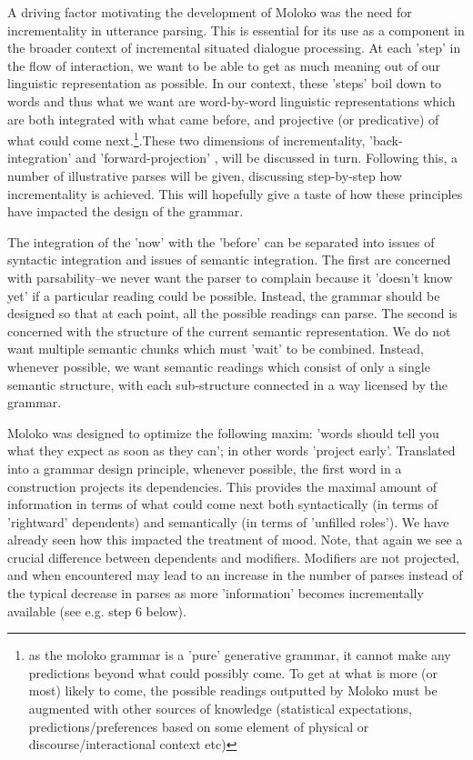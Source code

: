 
A driving factor motivating the development of Moloko was the need for incrementality in utterance parsing. This is essential for its use as a component in the broader context of incremental situated dialogue processing. At each 'step' in the flow of interaction, we want to be able to get as much meaning out of our linguistic representation as possible. In our context, these 'steps' boil down to words and thus what we want are word-by-word linguistic representations which are both integrated with what came before, and projective (or predicative) of what could come next.\footnote{as the moloko grammar is a 'pure' generative grammar, it cannot make any predictions beyond what could possibly come. To get at what is more (or most) likely to come, the possible readings outputted by Moloko must be augmented with other sources of knowledge (statistical expectations, predictions/preferences based on some element of physical or  discourse/interactional context  etc)}.These two dimensions of incrementality, 'back-integration' and 'forward-projection' , will be discussed in turn. Following this, a number of illustrative parses will be given, discussing step-by-step how incrementality is achieved. This will hopefully give a taste of how these principles have impacted the design of the grammar.


The integration of the 'now' with the 'before' can be separated into issues of syntactic integration and issues of semantic integration. The first are concerned with parsability--we never want the parser to complain because it 'doesn't know yet' if a particular reading could be possible. Instead, the grammar should be designed so that at each point, all the possible readings can parse. The second is concerned with the structure of the current semantic representation. We do not want multiple semantic chunks which must 'wait' to be combined. Instead, whenever possible, we want semantic readings which consist of only a single semantic structure, with each sub-structure connected in a way licensed by the grammar.


Moloko was designed to optimize the following maxim: 'words should tell you what they expect as soon as they can';  in other words 'project early'. Translated into a grammar design principle, whenever possible, the first word in a construction projects its dependencies. This provides the maximal amount of information in terms of what could come next both syntactically (in terms of 'rightward' dependents) and semantically (in terms of 'unfilled roles'). We have already seen how this impacted the treatment of mood. Note, that again we see a crucial difference between dependents and modifiers. Modifiers are not projected, and when encountered may lead to an increase in the number of parses instead of the typical decrease in parses as more 'information' becomes incrementally available (see e.g. step 6 below).

